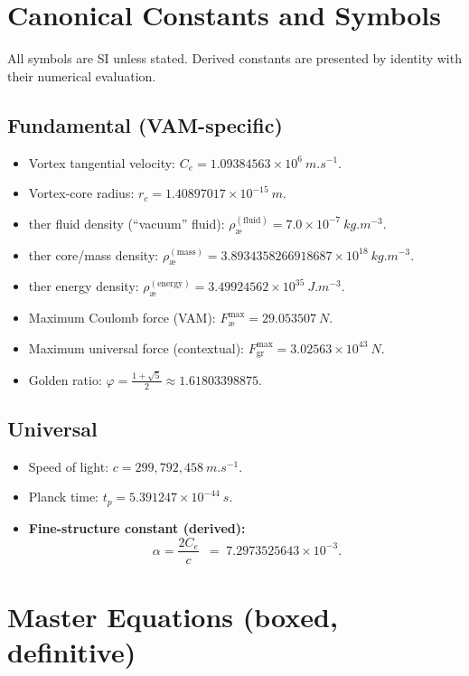 \documentclass[11pt,a4paper]{article}
\newcommand{\aeether}{\text{\ae}} %
\begin{document}
    \section{Canonical Constants and Symbols}
    All symbols are SI unless stated. Derived constants are presented by identity with their numerical evaluation.
    \subsection{Fundamental (VAM-specific)}
    \begin{itemize}
        \item Vortex tangential velocity: $C_e = 1.09384563\times 10^{6}\ \si{m.s^{-1}}$.
        \item Vortex-core radius: $r_c = 1.40897017\times 10^{-15}\ \si{m}$.
        \item \aeether{}ther fluid density (``vacuum'' fluid): $\rho_{\aeether}^{(\mathrm{fluid})} = 7.0\times 10^{-7}\ \si{kg.m^{-3}}$.
        \item \aeether{}ther core/mass density: $\rho_{\aeether}^{(\mathrm{mass})} = 3.8934358266918687\times 10^{18}\ \si{kg.m^{-3}}$.
        \item \aeether{}ther energy density: $\rho_{\aeether}^{(\mathrm{energy})} = 3.49924562\times 10^{35}\ \si{J.m^{-3}}$.
        \item Maximum Coulomb force (VAM): $F_{\aeether}^{\max} = 29.053507\ \si{N}$.
        \item Maximum universal force (contextual): $F_{\mathrm{gr}}^{\max} = 3.02563\times 10^{43}\ \si{N}$.
        \item Golden ratio: $\varphi = \frac{1+\sqrt{5}}{2} \approx 1.61803398875$.
    \end{itemize}
    \subsection{Universal}
    \begin{itemize}
        \item Speed of light: $c = 299{,}792{,}458\ \si{m.s^{-1}}$.
        \item Planck time: $t_p = 5.391247\times 10^{-44}\ \si{s}$.
        \item \textbf{Fine-structure constant (derived):}
        \[
            \boxed{\ \alpha = \frac{2C_e}{c}\ } \;=\; 7.2973525643\times 10^{-3}.
        \]
    \end{itemize}

    \section{Master Equations (boxed, definitive)}
\end{document}
